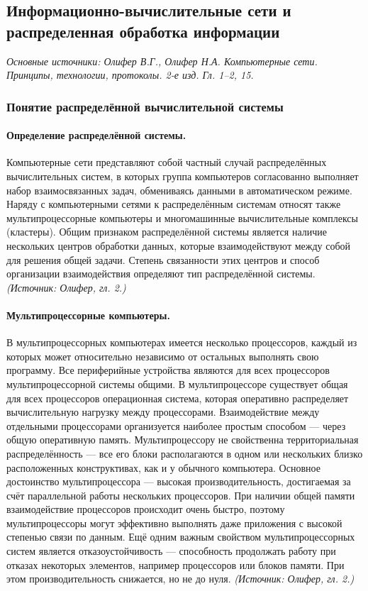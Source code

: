 \documentclass[a4paper,12pt]{article}
\begin{document}
\subsection{Информационно-вычислительные сети и распределенная обработка информации}

\noindent\textit{Основные источники: Олифер В.Г., Олифер Н.А. Компьютерные сети. Принципы, технологии, протоколы. 2-е изд. Гл. 1–2, 15.}

\subsubsection{Понятие распределённой вычислительной системы}

\paragraph{Определение распределённой системы.}
Компьютерные сети представляют собой частный случай распределённых вычислительных систем, в которых группа компьютеров согласованно выполняет набор взаимосвязанных задач, обмениваясь данными в автоматическом режиме. Наряду с компьютерными сетями к распределённым системам относят также мультипроцессорные компьютеры и многомашинные вычислительные комплексы (кластеры). Общим признаком распределённой системы является наличие нескольких центров обработки данных, которые взаимодействуют между собой для решения общей задачи. Степень связанности этих центров и способ организации взаимодействия определяют тип распределённой системы.
\textit{(Источник: Олифер, гл. 2.)}

\paragraph{Мультипроцессорные компьютеры.}
В мультипроцессорных компьютерах имеется несколько процессоров, каждый из которых может относительно независимо от остальных выполнять свою программу. Все периферийные устройства являются для всех процессоров мультипроцессорной системы общими. В мультипроцессоре существует общая для всех процессоров операционная система, которая оперативно распределяет вычислительную нагрузку между процессорами. Взаимодействие между отдельными процессорами организуется наиболее простым способом — через общую оперативную память. Мультипроцессору не свойственна территориальная распределённость — все его блоки располагаются в одном или нескольких близко расположенных конструктивах, как и у обычного компьютера. Основное достоинство мультипроцессора — высокая производительность, достигаемая за счёт параллельной работы нескольких процессоров. При наличии общей памяти взаимодействие процессоров происходит очень быстро, поэтому мультипроцессоры могут эффективно выполнять даже приложения с высокой степенью связи по данным. Ещё одним важным свойством мультипроцессорных систем является отказоустойчивость — способность продолжать работу при отказах некоторых элементов, например процессоров или блоков памяти. При этом производительность снижается, но не до нуля.
\textit{(Источник: Олифер, гл. 2.)}
\end{document}
